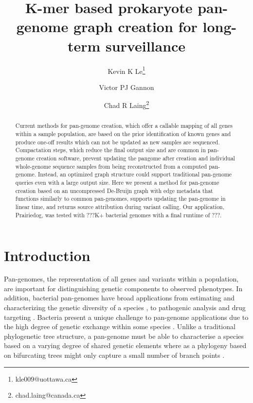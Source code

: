\documentclass{article}
\begin{document}
\title{K-mer based prokaryote pan-genome graph creation for long-term surveillance}

\author[1]{Kevin K Le\thanks{kle009@uottawa.ca}}
\author[1]{Victor PJ Gannon}
\author[2]{Chad R Laing\thanks{chad.laing@canada.ca}}

\renewcommand\Authands{ and }

\maketitle

\begin{abstract}

Current methods for pan-genome creation, which offer a callable mapping of all genes within a sample population, are based on the prior identification of known genes and produce one-off results which can not be updated as new samples are sequenced.
Compactation steps, which reduce the final output size and are common in pan-genome creation software, prevent updating the pangome after creation and individual whole-genome sequence samples from being reconstructed from a computed pan-genome.
Instead, an optimized graph structure could support traditional pan-genome queries even with a large output size.
Here we present a method for pan-genome creation based on an uncompressed De-Bruijn graph with edge metadata that functions similarly to common pan-genomes, supports updating the pan-genome in linear time, and returns source attribution during variant calling.
Our application, Prairiedog, was tested with ???K+ bacterial genomes with a final runtime of ???.

\end{abstract}


\section{Introduction}

Pan-genomes, the representation of all genes and variants within a population, are important for distinguishing genetic components to observed phenotypes.
In addition, bacterial pan-genomes have broad applications from estimating and characterizing the genetic diversity of a species \cite{medini2005microbial}, to pathogenic analysis \cite{tettelin2005genome, rasko2008pangenome} and drug targeting \cite{muzzi2007pan}.
Bacteria present a unique challenge to pan-genome applications due to the high degree of genetic exchange within some species \cite{medini2005microbial}.
Unlike a traditional phylogenetic tree structure, a pan-genome must be able to characterise a species based on a varying degree of shared genetic elements where as a phylogeny based on bifurcating trees might only capture a small number of branch points \cite{vernikos2015ten}.
\end{document}
